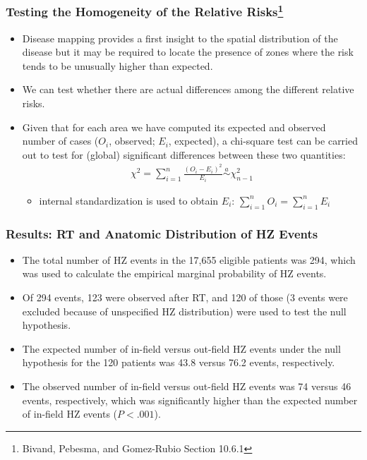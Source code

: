 \documentclass[aspectratio=169, 12pt]{beamer}
\begin{document}
	\begin{frame}
	\frametitle{Testing the Homogeneity of the Relative Risks\footnote{Bivand, Pebesma, and Gomez-Rubio Section 10.6.1}}
	\begin{itemize}
	\item Disease mapping provides a first insight to the spatial distribution of the disease but it may be required to locate the presence of zones where the risk tends to be unusually higher than expected.
	\item We can test whether there are actual differences among the different relative risks.
	\item Given that for each area we have computed its expected and observed number of cases ($O_i$, observed; $E_i$, expected), a chi-square test can be carried out to test for (global) significant differences between these two quantities:
	\begin{eqnarray*}
	\chi^2 = \sum_{i=1}^n \frac{(O_i-E_i)^2}{E_i} \overset{a}{\sim} \chi^2_{n-1}
	\end{eqnarray*}
	\begin{itemize}
	\item internal standardization is used to obtain $E_i$: $\sum_{i=1}^n O_i = \sum_{i=1}^n E_i $
	\end{itemize}

	\end{itemize}
	\end{frame}

	\begin{frame}
	\frametitle{Results: RT and Anatomic Distribution of HZ Events}
	\begin{itemize}
	\item The total number of HZ events in the 17,655 eligible patients was 294, which was used to calculate the empirical marginal probability of HZ events.
	\item Of 294 events, 123 were observed after RT, and 120 of those (3 events were excluded because of unspecified HZ distribution) were used to test the null hypothesis.
	\item The expected number of in-field versus out-field HZ events under the null hypothesis for the 120 patients was 43.8 versus 76.2 events, respectively.
	\item The observed number of in-field versus out-field HZ events was 74 versus 46 events, respectively, which was significantly higher than the expected number of in-field HZ events ($P < .001$).

	\end{itemize}
	\end{frame}
\end{document}
